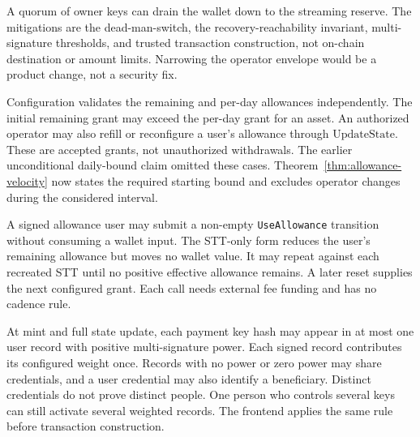 \begin{description}[leftmargin=1.4em,style=nextline]
\item[Broad operator spend (by design, G3).] A quorum of owner keys can drain the wallet down to the streaming reserve. The mitigations are the dead-man-switch, the recovery-reachability invariant, multi-signature thresholds, and trusted transaction construction, not on-chain destination or amount limits. Narrowing the operator envelope would be a product change, not a security fix.
\item[Allowance grants and operator changes.] Configuration validates the remaining and per-day allowances independently.
The initial remaining grant may exceed the per-day grant for an asset.
An authorized operator may also refill or reconfigure a user's allowance through $\mathrm{UpdateState}$.
These are accepted grants, not unauthorized withdrawals.
The earlier unconditional daily-bound claim omitted these cases.
Theorem~\ref{thm:allowance-velocity} now states the required starting bound and excludes operator changes during the considered interval.
\item[Wallet-less allowance succession.] A signed allowance user may submit a non-empty \texttt{UseAllowance} transition without consuming a wallet input. The STT-only form reduces the user's remaining allowance but moves no wallet value. It may repeat against each recreated STT until no positive effective allowance remains. A later reset supplies the next configured grant. Each call needs external fee funding and has no cadence rule.
\item[Positive-power records require distinct credentials.] At mint and full state update, each payment key hash may appear in at most one user record with positive multi-signature power. Each signed record contributes its configured weight once. Records with no power or zero power may share credentials, and a user credential may also identify a beneficiary. Distinct credentials do not prove distinct people. One person who controls several keys can still activate several weighted records. The frontend applies the same rule before transaction construction.

\end{description}
